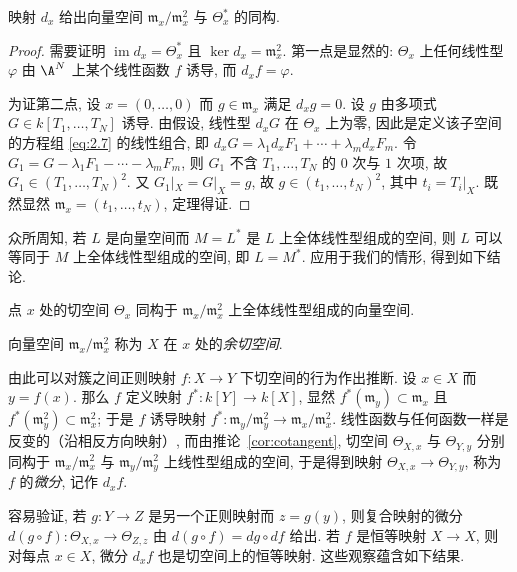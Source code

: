 \begin{theorem}\label{thm:differential-iso}
	映射 $d_x$ 给出向量空间 $\mathfrak m_x/\mathfrak m_x^2$ 与 $\Theta_x^*$ 的同构.
\end{theorem}

\begin{proof}
	需要证明 $\operatorname{im} d_x = \Theta_x^*$ 且 $\ker d_x = \mathfrak m_x^2$. 第一点是显然的: $\Theta_x$ 上任何线性型 $\varphi$ 由 $\A^N$ 上某个线性函数 $f$ 诱导, 而 $d_x f = \varphi$.

	为证第二点, 设 $x = (0, \ldots, 0)$ 而 $g \in \mathfrak m_x$ 满足 $d_x g = 0$. 设 $g$ 由多项式 $G \in k[T_1, \ldots, T_N]$ 诱导. 由假设, 线性型 $d_x G$ 在 $\Theta_x$ 上为零, 因此是定义该子空间的方程组 \eqref{eq:2.7} 的线性组合, 即 $d_x G = \lambda_1 d_x F_1 + \cdots + \lambda_m d_x F_m$. 令 $G_1 = G - \lambda_1 F_1 - \cdots - \lambda_m F_m$, 则 $G_1$ 不含 $T_1, \ldots, T_N$ 的 $0$ 次与 $1$ 次项, 故 $G_1 \in (T_1, \ldots, T_N)^2$. 又 $G_1|_X = G|_X = g$, 故 $g \in (t_1, \ldots, t_N)^2$, 其中 $t_i = T_i|_X$. 既然显然 $\mathfrak m_x = (t_1, \ldots, t_N)$, 定理得证.
\end{proof}

众所周知, 若 $L$ 是向量空间而 $M = L^*$ 是 $L$ 上全体线性型组成的空间, 则 $L$ 可以等同于 $M$ 上全体线性型组成的空间, 即 $L = M^*$. 应用于我们的情形, 得到如下结论.

\begin{corollary}\label{cor:cotangent}
	点 $x$ 处的切空间 $\Theta_x$ 同构于 $\mathfrak m_x/\mathfrak m_x^2$ 上全体线性型组成的向量空间.
\end{corollary}

向量空间 $\mathfrak m_x/\mathfrak m_x^2$ 称为 $X$ 在 $x$ 处的\emph{余切空间}.

由此可以对簇之间正则映射 $f: X \to Y$ 下切空间的行为作出推断. 设 $x \in X$ 而 $y = f(x)$. 那么 $f$ 定义映射 $f^*: k[Y] \to k[X]$, 显然 $f^*(\mathfrak m_y) \subset \mathfrak m_x$ 且 $f^*(\mathfrak m_y^2) \subset \mathfrak m_x^2$; 于是 $f$ 诱导映射 $f^*: \mathfrak m_y/\mathfrak m_y^2 \to \mathfrak m_x/\mathfrak m_x^2$. 线性函数与任何函数一样是反变的（沿相反方向映射）, 而由推论~\ref{cor:cotangent}, 切空间 $\Theta_{X,x}$ 与 $\Theta_{Y,y}$ 分别同构于 $\mathfrak m_x/\mathfrak m_x^2$ 与 $\mathfrak m_y/\mathfrak m_y^2$ 上线性型组成的空间, 于是得到映射 $\Theta_{X,x} \to \Theta_{Y,y}$, 称为 $f$ 的\emph{微分}, 记作 $d_x f$.

容易验证, 若 $g: Y \to Z$ 是另一个正则映射而 $z = g(y)$, 则复合映射的微分 $d(g \circ f): \Theta_{X,x} \to \Theta_{Z,z}$ 由 $d(g \circ f) = dg \circ df$ 给出. 若 $f$ 是恒等映射 $X \to X$, 则对每点 $x \in X$, 微分 $d_x f$ 也是切空间上的恒等映射. 这些观察蕴含如下结果.

